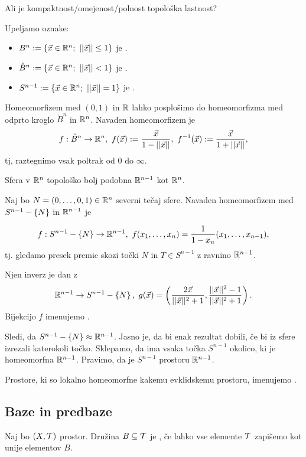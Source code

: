 \begin{primer}
    Ali je kompaktnost/omejenost/polnost topološka lastnost?
\end{primer}

Upeljamo oznake:
\begin{itemize}
    \item $B^n := \set{\vec{x} \in \R^n; \ ||\vec{x}|| \leq 1}$ je .
    \item $\mathring{B}^n := \left\{\vec{x} \in \mathbb{R}^n; \ ||\vec{x}|| < 1\right\}$ je .
    \item $S^{n-1} := \set{\vec{x} \in \R^n; \ ||\vec{x}|| = 1}$ je .
\end{itemize}

Homeomorfizem med $(0, 1)$ in $\mathbb{R}$ lahko posplošimo do homeomorfizma med odprto kroglo $\mathring{B}^n$ in $\mathbb{R}^n$. Navaden homeomorfizem je
$$f: \mathring{B}^n \to \mathbb{R}^n, \ f(\vec{x}) := \frac{\vec{x}}{1 - ||\vec{x}||}, \ f^{-1}(\vec{x}) := \frac{\vec{x}}{1 + ||\vec{x}||},$$
tj, raztegnimo vsak poltrak od $0$ do $\infty$.

Sfera v $\mathbb{R}^n$ topološko bolj podobna $\mathbb{R}^{n-1}$ kot $\mathbb{R}^n$.

Naj bo $N = (0, \ldots, 0, 1) \in \mathbb{R}^n$ severni tečaj sfere. Navaden homeomorfizem med $S^{n-1} - \left\{N\right\}$ in $\mathbb{R}^{n-1}$ je 

$$f: S^{n-1} - \set{N} \to \R^{n-1}, \ f(x_1, \ldots, x_n) = \frac{1}{1 - x_n}(x_1, \ldots, x_{n-1}),$$
tj. gledamo presek premic skozi točki $N$ in $T \in S^{n-1}$ z ravnino $\mathbb{R}^{n-1}$.

Njen inverz je dan z
$$\mathbb{R}^{n-1} \to S^{n-1} - \left\{N\right\},\  g(\vec{x}) = \left(\frac{2\vec{x}}{||\vec{x}||^2 + 1}, \frac{||\vec{x}||^2-1}{||\vec{x}||^2+1}\right).$$
Bijekcijo $f$ imenujemo .

Sledi, da $S^{n-1} - \left\{N\right\} \approx \mathbb{R}^{n-1}$. Jasno je, da bi enak rezultat dobili, če bi iz sfere izrezali katerokoli točko. Sklepamo, da ima vsaka točka $S^{n-1}$ okolico, ki je homeomorfna $\mathbb{R}^{n-1}$. Pravimo, da je $S^{n-1}$  prostoru $\mathbb{R}^{n-1}$.

\begin{definicija}
    Prostore, ki so lokalno homeomorfne kakemu evklidskemu prostoru, imenujemo .
\end{definicija}

\subsection{Baze in predbaze}
\begin{definicija}
    Naj bo $(X, \mathcal{T})$ prostor. Družina $B \subseteq \mathcal{T}$ je , če lahko vse elemente $\mathcal{T}$ zapišemo kot unije elementov $B$.
\end{definicija}

